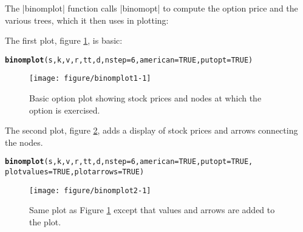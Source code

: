 \documentclass{article}\usepackage[]{graphicx}\usepackage[]{color}
\makeatletter
\newcommand{\hlnum}[1]{\textcolor[rgb]{0.686,0.059,0.569}{#1}}%
\newcommand{\hlstd}[1]{\textcolor[rgb]{0.345,0.345,0.345}{#1}}%
\newcommand{\hlkwc}[1]{\textcolor[rgb]{0.333,0.667,0.333}{#1}}%
\newcommand{\hlkwd}[1]{\textcolor[rgb]{0.737,0.353,0.396}{\textbf{#1}}}%
\newenvironment{kframe}{%
 \def\at@end@of@kframe{}%
 \ifinner\ifhmode%
  \def\at@end@of@kframe{\end{minipage}}%
  \begin{minipage}{\columnwidth}%
 \fi\fi%
 \def\FrameCommand##1{\hskip\@totalleftmargin \hskip-\fboxsep
 \colorbox{shadecolor}{##1}\hskip-\fboxsep
     \hskip-\linewidth \hskip-\@totalleftmargin \hskip\columnwidth}%
 \MakeFramed {\advance\hsize-\width
   \@totalleftmargin\z@ \linewidth\hsize
   \@setminipage}}%
 {\par\unskip\endMakeFramed%
 \at@end@of@kframe}
\newenvironment{knitrout}{}{} %
\makeatother
\begin{document}
The |binomplot| function calls |binomopt| to compute the option price
and the various trees, which it then uses in plotting:

The first plot, figure \ref{fig:binomplot1}, is basic:

\begin{knitrout}\footnotesize
{}\color{fgcolor}\begin{kframe}
\begin{alltt}
\hlkwd{binomplot}\hlstd{(s, k, v, r, tt, d,} \hlkwc{nstep}\hlstd{=}\hlnum{6}\hlstd{,} \hlkwc{american}\hlstd{=}\hlnum{TRUE}\hlstd{,} \hlkwc{putopt}\hlstd{=}\hlnum{TRUE}\hlstd{)}
\end{alltt}
\end{kframe}\begin{figure}

{\centering \texttt{[image: figure/binomplot1-1]} 

}

\caption{Basic option plot showing stock prices and nodes at which the option is exercised.\label{fig:binomplot1}}\label{fig:binomplot1}
\end{figure}


\end{knitrout}

The second plot, figure \ref{fig:binomplot2}, adds a display of stock
prices and arrows connecting the nodes.

\begin{knitrout}\footnotesize
{}\color{fgcolor}\begin{kframe}
\begin{alltt}
\hlkwd{binomplot}\hlstd{(s, k, v, r, tt, d,} \hlkwc{nstep}\hlstd{=}\hlnum{6}\hlstd{,} \hlkwc{american}\hlstd{=}\hlnum{TRUE}\hlstd{,} \hlkwc{putopt}\hlstd{=}\hlnum{TRUE}\hlstd{,}
    \hlkwc{plotvalues}\hlstd{=}\hlnum{TRUE}\hlstd{,} \hlkwc{plotarrows}\hlstd{=}\hlnum{TRUE}\hlstd{)}
\end{alltt}
\end{kframe}\begin{figure}

{\centering \texttt{[image: figure/binomplot2-1]} 

}

\caption{Same plot as Figure \ref{fig:binomplot1} except that values and arrows are added to the plot.\label{fig:binomplot2}}\label{fig:binomplot2}
\end{figure}


\end{knitrout}
\end{document}

